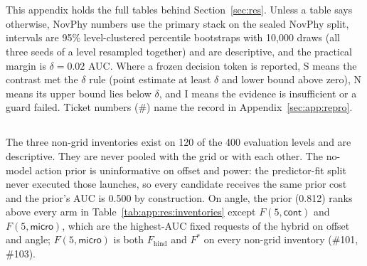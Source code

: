 \section{\texorpdfstring{}{Additional Results}}
\label{sec:app:results}

\begin{revblock}
\nopagebreak
This appendix holds the full tables behind Section~\ref{sec:res}. Unless a table says otherwise, NovPhy numbers use the primary stack on the sealed NovPhy split, intervals are 95\% level-clustered percentile bootstraps with 10{,}000 draws (all three seeds of a level resampled together) and are descriptive, and the practical margin is $\delta=0.02$ AUC. Where a frozen decision token is reported, S means the contrast met the $\delta$ rule (point estimate at least $\delta$ and lower bound above zero), N means its upper bound lies below $\delta$, and I means the evidence is insufficient or a guard failed. Ticket numbers (\#) name the record in Appendix~\ref{sec:app:repro}.
\end{revblock}

\subsection{\texorpdfstring{}{Offset, angle and power inventories}}
\label{sec:app:res:inventories}

\begin{revblock}
\nopagebreak
The three non-grid inventories exist on 120 of the 400 evaluation levels and are descriptive. They are never pooled with the grid or with each other. The no-model action prior is uninformative on offset and power: the predictor-fit split never executed those launches, so every candidate receives the same prior cost and the prior's AUC is 0.500 by construction. On angle, the prior (0.812) ranks above every arm in Table~\ref{tab:app:res:inventories} except $F(5,\textsf{cont})$ and $F(5,\textsf{micro})$, which are the highest-AUC fixed requests of the hybrid on offset and angle; $F(5,\textsf{micro})$ is both $F_{\mathrm{hind}}$ and $F^{*}$ on every non-grid inventory (\#101, \#103).
\end{revblock}

